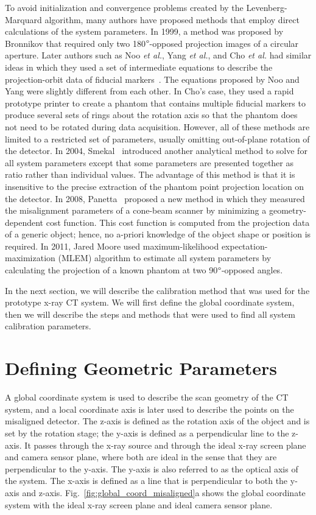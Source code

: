 To avoid initialization and convergence problems created by the Levenberg-Marquard algorithm, many authors have proposed methods that employ direct calculations of the system parameters.  In 1999, a method was proposed by Bronnikov that required only two 180$\degree$-opposed projection images of  a circular aperture.  Later authors such as Noo \textit{et al.}, Yang \textit{et al.}, and Cho \textit{et al.} had similar ideas in which they used a set of intermediate equations to describe the projection-orbit data of fiducial markers~\citep{Noo2000, Yang2006, Cho2005}.  The equations proposed by Noo and Yang were slightly different from each other.  In Cho's case, they used a rapid prototype printer to create a phantom that contains multiple fiducial markers to produce several sets of rings about the rotation axis so that the phantom does not need to be rotated during data acquisition.  However, all of these methods are limited to a restricted set of parameters, usually omitting out-of-plane rotation of the detector.  In 2004, Smekal~\citep{Smekal2004} introduced another analytical method to solve for all system parameters except that some parameters are presented together as ratio rather than individual values.  The advantage of this method is that it is insensitive to the precise extraction of the phantom point projection location on the detector.  In 2008, Panetta~\citep{Panetta2008} proposed a new method in which they measured the misalignment parameters of a cone-beam scanner by minimizing a geometry-dependent cost function.  This cost function is computed from the projection data of a generic object; hence, no a-priori knowledge of the object shape or position is required.  In 2011, Jared Moore used maximum-likelihood expectation-maximization (MLEM) algorithm to estimate all system parameters by calculating the projection of a known phantom at two 90$\degree$-opposed angles.

In the next section, we will describe the calibration method that was used for the prototype x-ray CT system.  We will first define the global coordinate system, then we will describe the steps and methods that were used to find all system calibration parameters.

\section{Defining Geometric Parameters}
A global coordinate system is used to describe the scan geometry of the CT system, and a local coordinate axis is later used to describe the points on the misaligned detector.  The z-axis is defined as the rotation axis of the object and is set by the rotation stage; the y-axis is defined as a perpendicular line to the z-axis.  It passes through the x-ray source and through the ideal x-ray screen plane and camera sensor plane, where both are ideal in the sense that they are perpendicular to the y-axis.  The y-axis is also referred to as the optical axis of the system.  The x-axis is defined as a line that is perpendicular to both the y-axis and z-axis.  Fig.~\ref{fig:global_coord_misaligned}a shows the global coordinate system with the ideal x-ray screen plane and ideal camera sensor plane.  

